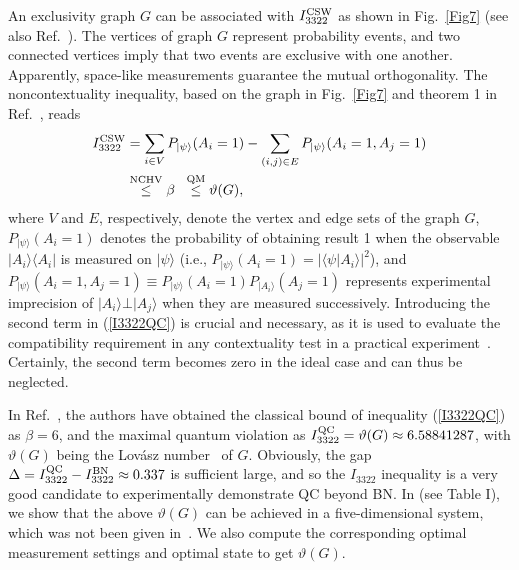 \documentclass[prl,letterpaper,english,reprint,nofootinbib,aps,superscriptaddress,showpacs,showkeys]{revtex4-1}
\theoremstyle{definition}
\theoremstyle{remark}
\begin{document}
An exclusivity graph $G$ can be associated with $I_{3322}^{\rm CSW}$ as shown in Fig.~\ref{Fig7} (see also Ref.~\cite{RDLTC14}).
The vertices of graph $G$ represent probability events, and two connected vertices imply that two events are exclusive with one another.
 Apparently, space-like measurements guarantee the mutual orthogonality.
The noncontextuality inequality, based on the graph in Fig.~\ref{Fig7} and theorem 1 in Ref.~\cite{cabello16}, reads
\begin{align}
I_{3322}^{\rm CSW}
&=\sum_{i\in V}P_{|\psi\rangle}(A_i=1)-\sum_{(i,j)\in E}P_{|\psi\rangle}(A_i=1,A_j=1)\nonumber\\
&\overset{{\rm{NCHV}}}\leq \beta \;\;\overset{{\rm{QM}}}\leq \vartheta(G),
\label{I3322QC}
\end{align}
where $V$ and $E$, respectively, denote the vertex and edge sets of the graph $G$,
$P_{|\psi\rangle}(A_i=1)$ denotes the probability of obtaining result 1 when the observable $|A_i\rangle\langle A_i|$ is measured on $|\psi\rangle $ (i.e., $P_{|\psi\rangle}(A_i=1)= |\langle \psi|A_i\rangle|^2$), and $P_{|\psi\rangle}(A_i=1,A_j=1)\equiv P_{|\psi\rangle}(A_i=1)P_{|A_i\rangle}(A_j=1)$ represents experimental imprecision of $|A_i\rangle\bot |A_j\rangle$ when they are measured successively.
Introducing the second term in (\ref{I3322QC}) is crucial and necessary, as it is used to evaluate the compatibility requirement in any contextuality test in a practical experiment~\cite{cabello16}. Certainly, the second term becomes zero in the ideal case and can thus be neglected.

In Ref.~\cite{RDLTC14}, the authors have obtained the classical bound of inequality (\ref{I3322QC}) as $\beta=6$, and the maximal quantum violation as $I_{3322}^{\rm QC}=\vartheta(G)\approx 6.58841287$, with $\vartheta(G)$ being the Lov\'asz number~\cite{Lovasz} of $G$. Obviously, the gap $\Delta=I_{3322}^{\rm QC}-I_{3322}^{\rm BN}\approx 0.337$ is sufficient large, and so the $I_{3322}$
inequality is a very good candidate to experimentally demonstrate QC beyond BN.
In \cite{SM} (see Table I), we show that the above $\vartheta(G)$ can be achieved in a five-dimensional system, which was not been given in~\cite{RDLTC14}. We also compute the corresponding optimal measurement settings and optimal state to get $\vartheta(G)$.
\end{document}
